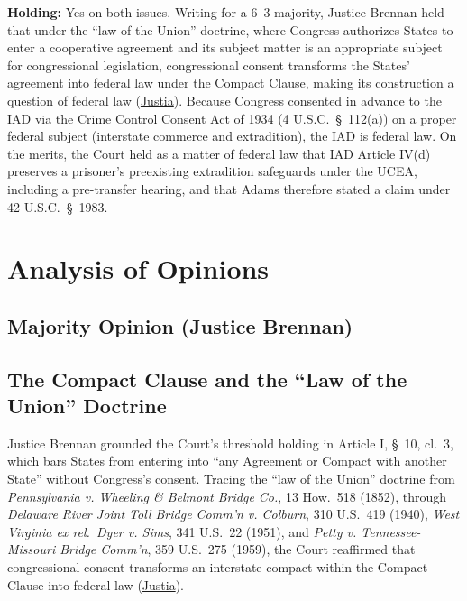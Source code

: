 \documentclass[12pt]{article}
\begin{document}
\textbf{Holding:} Yes on both issues. Writing for a 6--3 majority, Justice Brennan held that under the ``law of the Union'' doctrine, where Congress authorizes States to enter a cooperative agreement and its subject matter is an appropriate subject for congressional legislation, congressional consent transforms the States' agreement into federal law under the Compact Clause, making its construction a question of federal law (\href{https://supreme.justia.com/cases/federal/us/449/433/}{Justia}). Because Congress consented in advance to the IAD via the Crime Control Consent Act of 1934 (4 U.S.C.\ \S\ 112(a)) on a proper federal subject (interstate commerce and extradition), the IAD is federal law. On the merits, the Court held as a matter of federal law that IAD Article IV(d) preserves a prisoner's preexisting extradition safeguards under the UCEA, including a pre-transfer hearing, and that Adams therefore stated a claim under 42 U.S.C.\ \S\ 1983.

\section{Analysis of Opinions}
\subsection{Majority Opinion (Justice Brennan)}

\subsection{The Compact Clause and the ``Law of the Union'' Doctrine}
Justice Brennan grounded the Court's threshold holding in Article I, \S\ 10, cl.\ 3, which bars States from entering into ``any Agreement or Compact with another State'' without Congress's consent. Tracing the ``law of the Union'' doctrine from \textit{Pennsylvania v. Wheeling \& Belmont Bridge Co.}, 13 How.\ 518 (1852), through \textit{Delaware River Joint Toll Bridge Comm'n v. Colburn}, 310 U.S.\ 419 (1940), \textit{West Virginia ex rel.\ Dyer v. Sims}, 341 U.S.\ 22 (1951), and \textit{Petty v. Tennessee-Missouri Bridge Comm'n}, 359 U.S.\ 275 (1959), the Court reaffirmed that congressional consent transforms an interstate compact within the Compact Clause into federal law (\href{https://supreme.justia.com/cases/federal/us/449/433/}{Justia}).
\end{document}
